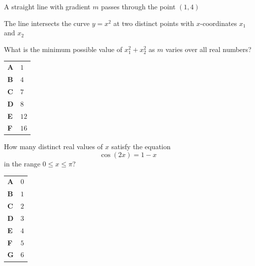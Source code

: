 \documentclass[11pt,a4paper]{article}
\begin{document}
\begin{enumerate}[label=\textbf{\arabic*.},leftmargin=*,itemsep=0pt,start=2]
\questionitem[Algebra]
A straight line with gradient $m$ passes through the point $(1, 4)$

The line intersects the curve $y = x^2$ at two distinct points with $x$-coordinates $x_1$ and $x_2$

What is the minimum possible value of $x_1^2 + x_2^2$ as $m$ varies over all real numbers?

\par\vspace*{12pt}
\begin{tabularx}{\linewidth}{@{}>{\bfseries}l Y@{}}
A &
$1$
\\[0.8em]
B &
$4$
\\[0.8em]
C &
$7$
\\[0.8em]
D &
$8$
\\[0.8em]
E &
$12$
\\[0.8em]
F &
$16$
\\
\end{tabularx}
\end{enumerate}
\clearpage
\thispagestyle{djspaper}
\vspace*{8pt}
\begin{enumerate}[label=\textbf{\arabic*.},leftmargin=*,itemsep=0pt,start=3]
\questionitem[Trigonometry]
How many distinct real values of $x$ satisfy the equation \[ \cos(2x)=1-x \] in the range $0\le x\le \pi$?

\par\vspace*{12pt}
\begin{tabularx}{\linewidth}{@{}>{\bfseries}l Y@{}}
A &
$0$
\\[0.8em]
B &
$1$
\\[0.8em]
C &
$2$
\\[0.8em]
D &
$3$
\\[0.8em]
E &
$4$
\\[0.8em]
F &
$5$
\\[0.8em]
G &
$6$
\\
\end{tabularx}
\end{enumerate}
\end{document}
